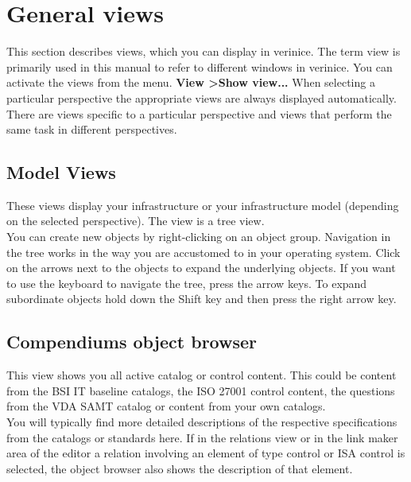 \documentclass[a4paper,10pt]{book}
\begin{document}
\chapter{General views}
This section describes views, which you can display in verinice. The term view is primarily used in this manual to refer to different windows in verinice.
You can activate the views from the menu.
\textbf{View \textgreater Show view...} When selecting a particular perspective the appropriate views are always displayed automatically.
\newline\\
There are views specific to a particular perspective and views that perform the same task in different perspectives.

\section{Model Views}
These views display your infrastructure or your infrastructure model (depending on the selected perspective).
The view is a tree view.
\newline\\
You can create new objects by right-clicking on an object group. Navigation in the tree works in the way
you are accustomed to in your operating system. Click on the arrows next to the objects to expand the
underlying objects. If you want to use the keyboard to navigate the tree, press the arrow keys. To expand
subordinate objects hold down the Shift key and then press the right arrow key.

\section{Compendiums object browser}
This view shows you all active catalog or control content. This could be content from the BSI IT
baseline catalogs, the ISO 27001 control content, the questions from the VDA SAMT catalog or content from your own catalogs.
\newline\\
You will typically find more detailed descriptions of the respective specifications from the catalogs or standards here.
If in the relations view or in the link maker area of the editor a relation involving an element of type control or ISA control is selected, the object
browser also shows the description of that element.
\end{document}
